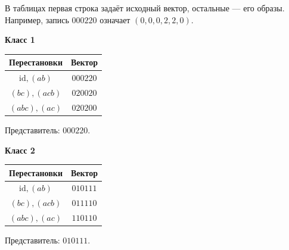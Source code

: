 \documentclass[12pt,a4paper]{article}
\begin{document}
В таблицах первая строка задаёт исходный вектор, остальные --- его образы.
Например, запись $000220$ означает $(0,0,0,2,2,0)$.

\begin{center}
\begin{minipage}[t]{.47\textwidth}
\centering\textbf{Класс 1}\\[5pt]
\begin{tabular}{cc}
Перестановки & Вектор\\\hline
$\mathrm{id},(ab)$ & $000220$\\
$(bc),(acb)$ & $020020$\\
$(abc),(ac)$ & $020200$
\end{tabular}

\medskip
Представитель: $000220$.

\end{minipage}\hfill
\begin{minipage}[t]{.47\textwidth}
\centering\textbf{Класс 2}\\[5pt]
\begin{tabular}{cc}
Перестановки & Вектор\\\hline
$\mathrm{id},(ab)$ & $010111$\\
$(bc),(acb)$ & $011110$\\
$(abc),(ac)$ & $110110$
\end{tabular}

\medskip
Представитель: $010111$.

\end{minipage}
\end{center}
\end{document}
